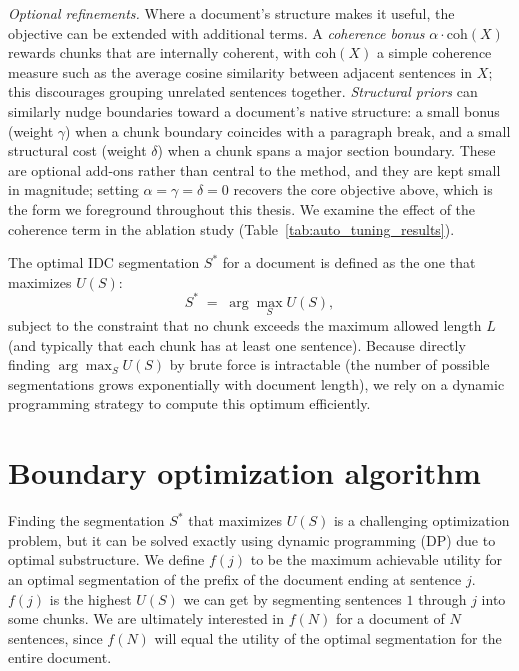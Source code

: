 \documentclass[12pt,a4paper]{report}
\begin{document}
\textit{Optional refinements.} Where a document's structure makes it useful, the objective can be extended with additional terms. A \emph{coherence bonus} $\alpha \cdot \text{coh}(X)$ rewards chunks that are internally coherent, with $\text{coh}(X)$ a simple coherence measure such as the average cosine similarity between adjacent sentences in $X$; this discourages grouping unrelated sentences together. \emph{Structural priors} can similarly nudge boundaries toward a document's native structure: a small bonus (weight $\gamma$) when a chunk boundary coincides with a paragraph break, and a small structural cost (weight $\delta$) when a chunk spans a major section boundary. These are optional add-ons rather than central to the method, and they are kept small in magnitude; setting $\alpha = \gamma = \delta = 0$ recovers the core objective above, which is the form we foreground throughout this thesis. We examine the effect of the coherence term in the ablation study (Table~\ref{tab:auto_tuning_results}).

The optimal IDC segmentation $S^*$ for a document is defined as the one that maximizes $U(S)$:
\[ 
    S^* \;=\; \arg\max_S U(S),
\] 
subject to the constraint that no chunk exceeds the maximum allowed length $L$ (and typically that each chunk has at least one sentence). Because directly finding $\arg\max_S U(S)$ by brute force is intractable (the number of possible segmentations grows exponentially with document length), we rely on a dynamic programming strategy to compute this optimum efficiently.

\section{Boundary optimization algorithm}

Finding the segmentation $S^*$ that maximizes $U(S)$ is a challenging optimization problem, but it can be solved exactly using dynamic programming (DP) due to optimal substructure. We define $f(j)$ to be the maximum achievable utility for an optimal segmentation of the prefix of the document ending at sentence $j$. $f(j)$ is the highest $U(S)$ we can get by segmenting sentences $1$ through $j$ into some chunks. We are ultimately interested in $f(N)$ for a document of $N$ sentences, since $f(N)$ will equal the utility of the optimal segmentation for the entire document.
\end{document}
